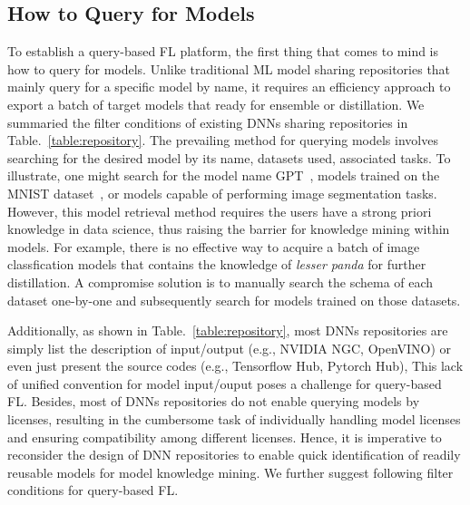 
\subsection{How to Query for Models}
\label{sec:how2query}
To establish a query-based FL platform, the first thing that comes to mind is how to query for models.
Unlike traditional ML model sharing repositories that mainly query for a specific model by name, it requires an efficiency approach to export a batch of target models that ready for ensemble or distillation.
We summaried the filter conditions of existing DNNs sharing repositories in Table.~\ref{table:repository}.
The prevailing method for querying models involves searching for the desired model by its name, datasets used, associated tasks.
To illustrate, one might search for the model name GPT~\cite{radford2019language}, models trained on the MNIST dataset~\cite{lecun2010mnist}, or models capable of performing image segmentation tasks.
However, this model retrieval method requires the users have a strong priori knowledge in data science, thus raising the barrier for knowledge mining within models.
For example, there is no effective way to acquire a batch of image classfication models that contains the knowledge of \textit{lesser panda} for further distillation.
A compromise solution is to manually search the schema of each dataset one-by-one and subsequently search for models trained on those datasets.

Additionally, as shown in Table.~\ref{table:repository}, most DNNs repositories are simply list the description of input/output (e.g., NVIDIA NGC, OpenVINO) or even just present the source codes (e.g., Tensorflow Hub, Pytorch Hub),
This lack of unified convention for model input/ouput poses a challenge for query-based FL.
Besides, most of DNNs repositories do not enable querying models by licenses, resulting in the cumbersome task of individually handling model licenses and ensuring compatibility among different licenses.
Hence, it is imperative to reconsider the design of DNN repositories to enable quick identification of readily reusable models for model knowledge mining. We further suggest following filter conditions for query-based FL.

